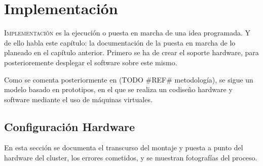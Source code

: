 \chapter{Implementación}
\label{chap:implementacion}

\lettrine{I}{mplementación} es la ejecución o puesta en marcha de una idea programada. Y de ello habla este capítulo: la documentación de la puesta en marcha de lo planeado en el capítulo anterior. Primero se ha de crear el soporte hardware, para posterioremente desplegar el software sobre este mismo.

Como se comenta posteriormente en (TODO \#REF\# metodología), se sigue un modelo basado en prototipos, en el que se realiza un codiseño hardware y software mediante el uso de máquinas virtuales.

\section{Configuración Hardware}
\label{sec:configuracion_hardware}
En esta sección se documenta el transcurso del montaje y puesta a punto del hardware del cluster, los errores cometidos, y se muestran fotografías del proceso.

